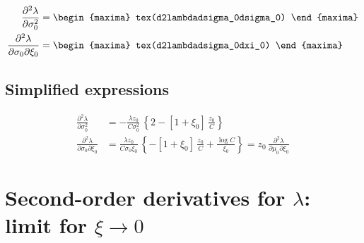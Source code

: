 {\color{MonVertF}
\begin{align*}
 \frac{\partial^2{\lambda}}{\partial \sigma_0^2}
  &=
\begin{maxima}
  tex(d2lambdadsigma_0dsigma_0)
\end{maxima}\\
\frac{\partial^2{\lambda}}{\partial \sigma_0 \partial \xi_0}
  &=
\begin{maxima}
  tex(d2lambdadsigma_0dxi_0)
\end{maxima}
\end{align*}
}

\subsection*{Simplified expressions}

{\color{red}
\begin{align*}
 \frac{\partial^2{\lambda}}{\partial \sigma_0^2}
  &=  - \frac{\lambda z_0}{C \sigma_0^2} \,
    \left\{ 2 - \left[1 + \xi_0\right] \, \frac{z_0}{C}
    \right\} \\
\frac{\partial^2{\lambda}}{\partial \sigma_0 \partial \xi_0}
  &= \frac{\lambda z_0}{C \sigma_0 \xi_0}\, \left\{ -\left[1 + \xi_0\right] \,
    \frac{z_0}{C} + \frac{\log C}{\xi_0} 
    \right\} = z_0 \, \frac{\partial^2{\lambda}}{\partial \mu_0 \partial \xi_0}
\end{align*}
}

\section{Second-order derivatives for $\lambda$:
  limit for $\xi \to 0$}

